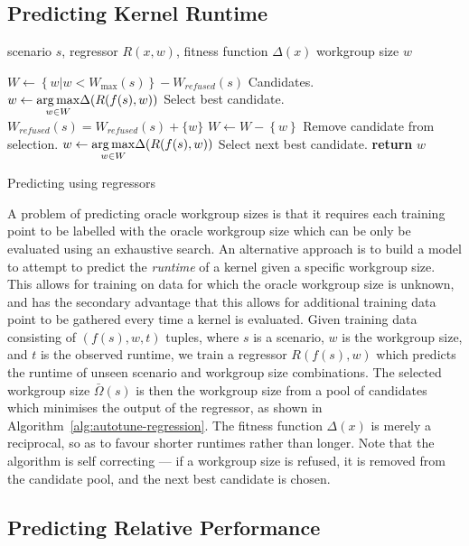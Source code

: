 \documentclass[nonatbib,preprint,10pt]{sigplanconf}
\begin{document}
\subsection{Predicting Kernel Runtime}

\begin{algorithm}[t]
\begin{algorithmic}[1]
\Require scenario $s$, regressor $R(x, w)$, fitness function $\Delta(x)$
\Ensure workgroup size $w$

\State $W \leftarrow \left\{ w | w < W_{\max}(s) \right\} -
W_{refused}(s)$
\Comment Candidates.
\State $w \leftarrow \underset{w \in W}{\operatorname*{arg\,max}} \Delta(R(f(s), w))$
\Comment Select best candidate.
  \State $W_{refused}(s) = W_{refused}(s) + \{w\}$
  \State $W \leftarrow W - \left\{ w \right\}$
  \Comment Remove candidate from selection.
  \State $w \leftarrow \underset{w \in W}{\operatorname*{arg\,max}} \Delta(R(f(s), w))$
  \Comment Select next best candidate.
\EndWhile
\State \textbf{return} $w$
\end{algorithmic}
\caption{Predicting using regressors}
\label{alg:autotune-regression}
\end{algorithm}

A problem of predicting oracle workgroup sizes is that it requires
each training point to be labelled with the oracle workgroup size
which can be only be evaluated using an exhaustive search. An
alternative approach is to build a model to attempt to predict the
\emph{runtime} of a kernel given a specific workgroup size. This
allows for training on data for which the oracle workgroup size is
unknown, and has the secondary advantage that this allows for
additional training data point to be gathered every time a kernel is
evaluated. Given training data consisting of $(f(s),w,t)$ tuples,
where $s$ is a scenario, $w$ is the workgroup size, and $t$ is the
observed runtime, we train a regressor $R(f(s), w)$ which predicts the
runtime of unseen scenario and workgroup size combinations. The
selected workgroup size $\bar{\Omega}(s)$ is then the workgroup size
from a pool of candidates which minimises the output of the regressor,
as shown in Algorithm~\ref{alg:autotune-regression}. The fitness
function $\Delta(x)$ is merely a reciprocal, so as to favour shorter
runtimes rather than longer. Note that the algorithm is self
correcting --- if a workgroup size is refused, it is removed from the
candidate pool, and the next best candidate is chosen.


\subsection{Predicting Relative Performance}
\end{document}
